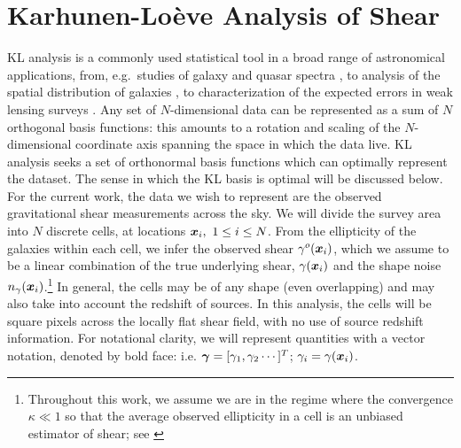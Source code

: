 \section{Karhunen-Lo\`{e}ve Analysis of Shear}
\label{KL_Intro}
KL analysis is a commonly used statistical tool
in a broad range of astronomical applications, from, e.g.~studies of 
galaxy and quasar spectra \citep{Connolly95,Connolly99,Yip04a,Yip04b}, to 
analysis of the spatial distribution of galaxies 
\citep{Vogeley96,Matsubara00,Pope04}, to characterization of the 
expected errors in weak lensing surveys \citep{Kilbinger06, Munshi06}.    
Any set of $N$-dimensional data can be represented as a sum of 
$N$ orthogonal basis functions: this amounts to a rotation and scaling of 
the $N$-dimensional coordinate axis spanning the space in which the data live.
KL analysis seeks a set of orthonormal basis functions which can optimally
represent the dataset.  The sense in which the KL basis is optimal will be
discussed below.  For the current work, the data we wish to represent are the 
observed gravitational shear measurements across the sky.  
We will divide the survey 
area into $N$ discrete cells, at locations $\myvec{x}_i,\ 1\le i \le N$.  
From the ellipticity of the galaxies within each cell, 
we infer the observed shear $\gamma^o(\boldsymbol{x}_i)$, which we assume
to be a linear combination of the true underlying shear, $\gamma(\boldsymbol{x}_i)$
and the shape noise $n_\gamma(\boldsymbol{x}_i)$.\footnote{
Throughout this work, we assume we are in the regime where the convergence
$\kappa \ll 1$ so that the average observed ellipticity in a 
cell is an unbiased estimator of shear; see \citet{Bartelmann01}}
In general, the cells may be of any shape (even overlapping) 
and may also take into account the redshift of sources.
In this analysis, the cells will be square pixels across the locally 
flat shear field, with no use of source redshift information.  
For notational clarity, we will represent quantities with a vector notation,
denoted by bold face: i.e. $\boldsymbol{\gamma} = [\gamma_1,\gamma_2\cdots]^T$; 
$\gamma_i = \gamma(\boldsymbol{x}_i)$. 

